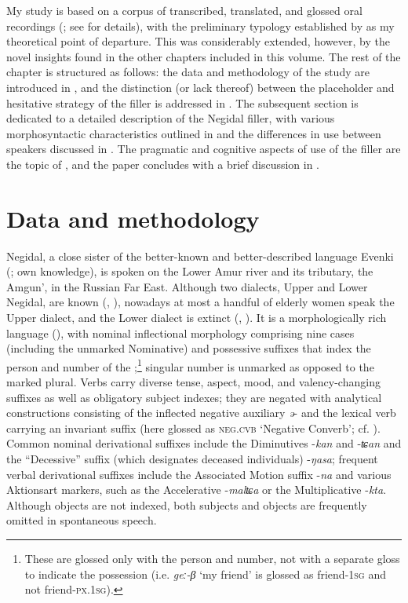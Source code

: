 \documentclass[output=paper]{langscibook}
\begin{document}
My study is based on a corpus of transcribed, translated, and glossed oral recordings (\citealt{PakendorfAralova2017}; see  for details), with the preliminary typology established by \citet{Podlesskaya2010} as my theoretical point of departure. This was considerably extended, however, by the novel insights found in the other chapters included in this volume. The rest of the chapter is structured as follows: the data and methodology of the study are introduced in , and the distinction (or lack thereof) between the placeholder and hesitative strategy of the filler is addressed in . The subsequent section is dedicated to a detailed description of the Negidal filler, with various morphosyntactic characteristics outlined in  and the differences in use between speakers discussed in . The pragmatic and cognitive aspects of use of the filler are the topic of , and the paper concludes with a brief discussion in .

\section{Data and methodology}
\label{sec:pakendorf:2}
Negidal, a close sister of the better-known and better-described language Evenki (\citealt{Oskolskaya2024}; own knowledge), is spoken on the Lower Amur river and its tributary, the Amgun’, in the Russian Far East. Although two dialects, Upper and Lower Negidal, are known (\citealt{Cincius1931}, \citealt[453]{PevnovKhasanova2006}), nowadays at most a handful of elderly women speak the Upper dialect, and the Lower dialect is extinct (\citealt[272]{kalinina2008}, \citealt{PakendorfAralova2018}). It is a morphologically rich language (\citealt{pakendorf2020}), with nominal inflectional morphology comprising nine cases (including the unmarked Nominative) and possessive suffixes that index the person and number of the ;\footnote{These are glossed only with the person and number, not with a separate gloss to indicate the possession (i.e. \textit{geː-β} ‘my friend’ is glossed as friend-1\textsc{sg} and not friend-\textsc{px.1sg}).} singular number is unmarked as opposed to the marked plural. Verbs carry diverse tense, aspect, mood, and valency-changing suffixes as well as obligatory subject indexes; they are negated with analytical constructions consisting of the inflected negative auxiliary \textit{ə}{}- and the lexical verb carrying an invariant suffix (here glossed as \textsc{neg.cvb} ‘Negative Converb’; cf. \citealt{Hölzl2015}). Common nominal derivational suffixes include the Diminutives -\textit{kan} and -\textit{ʨan} and the “Decessive” suffix (which designates deceased individuals) -\textit{ŋasa}; frequent verbal derivational suffixes include the Associated Motion suffix -\textit{na} and various Aktionsart markers, such as the Accelerative -\textit{malʨa} or the Multiplicative -\textit{kta}. Although objects are not indexed, both subjects and objects are frequently omitted in spontaneous speech.
\end{document}
